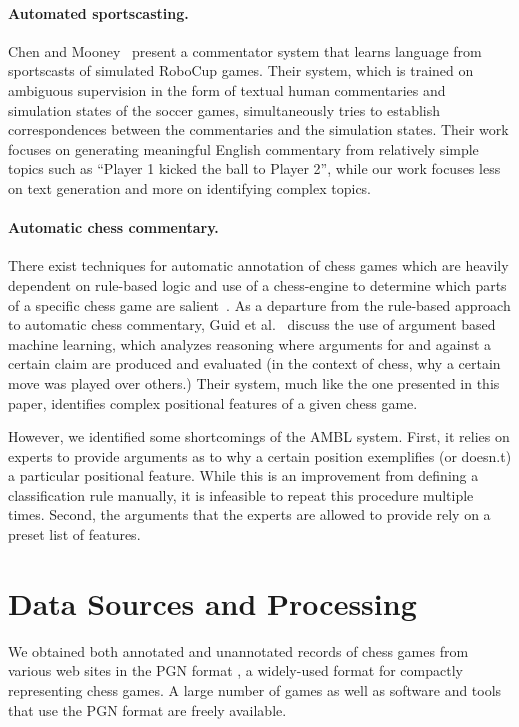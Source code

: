 \documentclass[11pt]{article}
\begin{document}
\paragraph{Automated sportscasting.} Chen and Mooney~ 
present a commentator system that learns language from sportscasts of 
simulated RoboCup games. Their system, which is trained on ambiguous 
supervision in the form of textual human commentaries and simulation 
states of the soccer games, simultaneously tries to establish 
correspondences between the commentaries and the simulation states. 
Their work focuses on generating meaningful English commentary from 
relatively simple topics such as ``Player 1 kicked the ball to Player 
2'', while our work focuses less on text generation and more on 
identifying complex topics.

\paragraph{Automatic chess commentary.} There exist techniques for 
automatic annotation of chess games which are heavily dependent on 
rule-based logic and use of a chess-engine to determine which parts of a 
specific chess game are salient~\cite{cambridge-chess-annotation}. As a 
departure from the rule-based approach to automatic chess commentary, 
Guid et al.~ discuss the use of argument based machine 
learning, which analyzes reasoning where arguments for and against a 
certain claim are produced and evaluated (in the context of chess, why a 
certain move was played over others.) Their system, much like the one 
presented in this paper, identifies complex positional features of a 
given chess game.

However, we identified some shortcomings of the AMBL system. First, it 
relies on experts to provide arguments as to why a certain position 
exemplifies (or doesn.t) a particular positional feature. While this is 
an improvement from defining a classification rule manually, it is 
infeasible to repeat this procedure multiple times. Second, the 
arguments that the experts are allowed to provide rely on a preset list 
of features.

\section{Data Sources and Processing}
We obtained both annotated and unannotated records of chess games from 
various web sites in the PGN format \cite{pgn}, a widely-used format for 
compactly representing chess games. A large number of games as well as 
software and tools that use the PGN format are freely available. 
\end{document}
